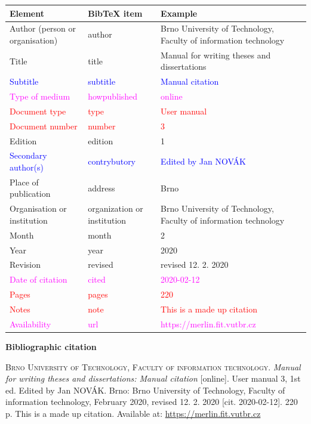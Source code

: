 \begin{tabularx}{\linewidth}{X X X}
    Element & BibTeX item & Example\\\hline
    Author (person or organisation) & author & Brno University of Technology, Faculty of information technology\\
    Title & title & Manual for writing theses and dissertations\\
    \textcolor{blue}{Subtitle} & \textcolor{blue}{subtitle} & \textcolor{blue}{Manual citation}\\
    \textcolor{magenta}{Type of medium} & \textcolor{magenta}{howpublished} & \textcolor{magenta}{online}\\
    \textcolor{red}{Document type} & \textcolor{red}{type} & \textcolor{red}{User manual}\\
    \textcolor{red}{Document number} & \textcolor{red}{number} & \textcolor{red}{3}\\
    Edition & edition & 1\\
    \textcolor{blue}{Secondary author(s)} & \textcolor{blue}{contrybutory} & \textcolor{blue}{Edited by Jan NOVÁK}\\
    Place of publication & address & Brno\\
    Organisation or institution & organization or institution & Brno University of Technology, Faculty of information technology\\
    Month & month & 2\\
    Year & year & 2020\\
    Revision & revised & revised 12. 2. 2020\\
    \textcolor{magenta}{Date of citation} & \textcolor{magenta}{cited} & \textcolor{magenta}{2020-02-12}\\
    \textcolor{red}{Pages} & \textcolor{red}{pages} & \textcolor{red}{220}\\   
    \textcolor{red}{Notes} & \textcolor{red}{note} & \textcolor{red}{This is a made up citation}\\
    \textcolor{magenta}{Availability} & \textcolor{magenta}{url} & \textcolor{magenta}{https://merlin.fit.vutbr.cz}\\
\end{tabularx}

\bigskip

\noindent \textbf{Bibliographic citation}

\medskip

\noindent \textsc{Brno University of Technology, Faculty of information technology}. \textit{Manual for writing theses and dissertations: Manual citation} [online]. User manual 3, 1st ed. Edited by Jan NOVÁK.
Brno: Brno University of Technology, Faculty of information technology, February 2020, revised 12. 2. 2020 [cit. 2020-02-12]. 220 p. This is a made up citation. Available at: \url{https://merlin.fit.vutbr.cz}
\newpage
